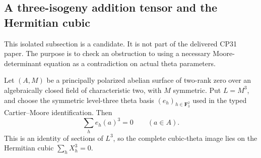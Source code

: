 \subsection{A three-isogeny addition tensor and the Hermitian cubic}
\label{subsec:f0-theta-Hermitian-containment}

This isolated subsection is a candidate.  It is not part of the
delivered CP31 paper.  The purpose is to check an obstruction to using
a necessary Moore-determinant equation as a contradiction on actual
theta parameters.

\begin{proposition}
\label{prop:f0-theta-Hermitian-containment}
Let \((A,M)\) be a principally polarized abelian surface of two-rank
zero over an algebraically closed field of characteristic two, with
\(M\) symmetric.  Put \(L=M^3\), and choose the symmetric
level-three theta basis \((e_h)_{h\in\mathbf F_3^2}\) used in the
typed Cartier--Moore identification.  Then
\[
                         \sum_h e_h(a)^3=0
                         \qquad(a\in A).
                                                        \tag{THC1}
\]
This is an identity of sections of \(L^3\), so the complete
cubic-theta image lies on the Hermitian cubic
\(\sum_h X_h^3=0\).
\end{proposition}
